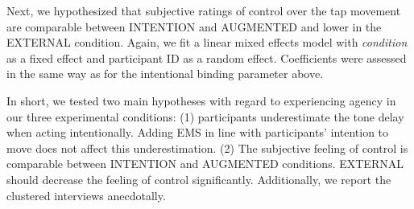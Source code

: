 Next, we hypothesized that subjective ratings of control over the tap movement are comparable between INTENTION and AUGMENTED and lower in the EXTERNAL condition. Again, we fit a linear mixed effects model with \textit{condition} as a fixed effect and participant ID as a random effect. Coefficients were assessed in the same way as for the intentional binding parameter above.

In short, we tested two main hypotheses with regard to experiencing agency in our three experimental conditions: (1) participants underestimate the tone delay when acting intentionally. Adding EMS in line with participants' intention to move does not affect this underestimation. (2) The subjective feeling of control is comparable between INTENTION and AUGMENTED conditions. EXTERNAL should decrease the feeling of control significantly. Additionally, we report the clustered interviews anecdotally.






